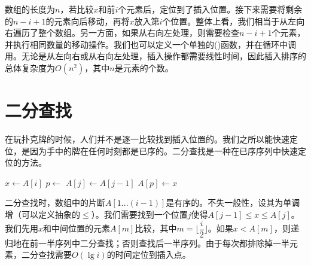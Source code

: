 \documentclass[b5paper]{ctexart}
\begin{document}
数组的长度为$n$，若比较$x$和前$i$个元素后，定位到了插入位置。接下来需要将剩余的$n - i + 1$的元素向后移动，再将$x$放入第$i$个位置。整体上看，我们相当于从左向右遍历了整个数组。另一方面，如果从右向左处理，则需要检查$n - i + 1$个元素，并执行相同数量的移动操作。我们也可以定义一个单独的()函数，并在循环中调用。无论是从左向右或从右向左处理，插入操作都需要线性时间，因此插入排序的总体复杂度为$O(n^2)$，其中$n$是元素的个数。

\begin{Exercise}\label{ex:isort-insert}
\end{Exercise}

\begin{Answer}[ref = {ex:isort-insert}]
\end{Answer}

\section{二分查找}

在玩扑克牌的时候，人们并不是逐一比较找到插入位置的。我们之所以能快速定位，是因为手中的牌在任何时刻都是已序的。二分查找是一种在已序序列中快速定位的方法。

\begin{algorithmic}[1]
    \State $x \gets A[i]$
    \State $p \gets $ 
      \State $A[j] \gets A[j-1]$
    \EndFor
    \State $A[p] \gets x$
  \EndFor
\EndFunction
\end{algorithmic}

二分查找时，数组中的片断$A[1...(i-1)]$是有序的。不失一般性，设其为单调增（可以定义抽象的$\leq$）。我们需要找到一个位置$j$使得$A[j-1] \leq x \leq A[j]$。我们先用$x$和中间位置的元素$A[m]$比较，其中$m = \lfloor \dfrac{i}{2} \rfloor$。如果$x < A[m]$，则递归地在前一半序列中二分查找；否则查找后一半序列。由于每次都排除掉一半元素，二分查找需要$O(\lg i)$的时间定位到插入点。
\end{document}
